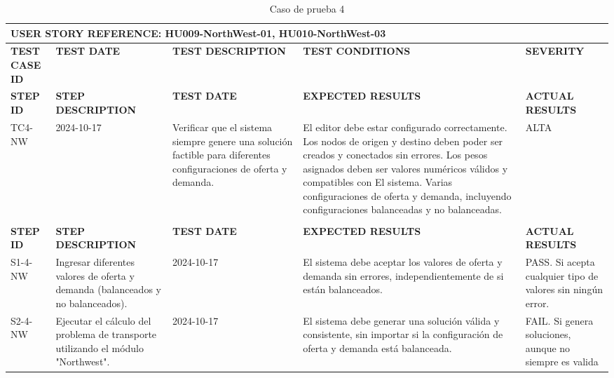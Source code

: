 \documentclass[stu, 12pt, letterpaper, donotrepeattitle, floatsintext, natbib]{apa7}
\begin{document}
\begin{longtable}{|p{2cm}|p{3cm}|p{3cm}|p{3cm}|p{3cm}|}
    \caption{Caso de prueba 4} \label{tab:casos_prueba4} \\
    \hline
        \multicolumn{5}{|l|}{\textbf{USER STORY REFERENCE: HU009-NorthWest-01, HU010-NorthWest-03}} \\ \hline

    \textbf{TEST CASE ID} & \textbf{TEST DATE} & \textbf{TEST DESCRIPTION} & \textbf{TEST CONDITIONS} & \textbf{SEVERITY} \\ \hline

    \endfirsthead
    \hline
    \textbf{STEP ID} & \textbf{STEP DESCRIPTION} & \textbf{TEST DATE} & \textbf{EXPECTED RESULTS} & \textbf{ACTUAL RESULTS} \\ \hline
    \endhead
    TC4-NW & 2024-10-17 & Verificar que el sistema siempre genere una solución factible para diferentes configuraciones de oferta y demanda. & El editor debe estar configurado correctamente. Los nodos de origen y destino deben poder ser creados y conectados sin errores. Los pesos asignados deben ser valores numéricos válidos y compatibles con El sistema. Varias configuraciones de oferta y demanda, incluyendo configuraciones balanceadas y no balanceadas. & ALTA                                                                                           \\ \\ \hline
    \textbf{STEP ID} & \textbf{STEP DESCRIPTION} & \textbf{TEST DATE} & \textbf{EXPECTED RESULTS} & \textbf{ACTUAL RESULTS} \\ \hline
    S1-4-NW & Ingresar diferentes valores de oferta y demanda (balanceados y no balanceados). & 2024-10-17 & El sistema debe aceptar los valores de oferta y demanda sin errores, independientemente de si están balanceados. & PASS. Si acepta cualquier tipo de valores sin ningún error. \\ \hline
    S2-4-NW & Ejecutar el cálculo del problema de transporte utilizando el módulo "Northwest". & 2024-10-17 & El sistema debe generar una solución válida y consistente, sin importar si la configuración de oferta y demanda está balanceada. & FAIL. Si genera soluciones, aunque no siempre es valida \\ \hline
\end{longtable}
\end{document}
